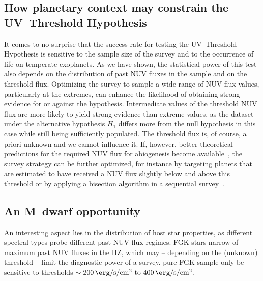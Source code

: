 \documentclass[twocolumn,twocolappendix,linenumbers]{aastex631}
\begin{document}
\subsection{How planetary context may constrain the UV~Threshold Hypothesis} %
It comes to no surprise that the success rate for testing the UV~Threshold Hypothesis is sensitive to the sample size of the survey and to the occurrence of life on temperate exoplanets.
As we have shown, the statistical power of this test also depends on the distribution of past \gls{NUV} fluxes in the sample and on the threshold flux.
Optimizing the survey to sample a wide range of \gls{NUV} flux values, particularly at the extremes, can enhance the likelihood of obtaining strong evidence for or against the hypothesis.
Intermediate values of the threshold \gls{NUV} flux are more likely to yield strong evidence than extreme values, as the dataset under the alternative hypothesis $H_1$ differs more from the null hypothesis in this case while still being sufficiently populated.
The threshold flux is, of course, a priori unknown and we cannot influence it.
If, however, better theoretical predictions for the required \gls{NUV} flux for abiogenesis become available~\citep{Rimmer2021}, the survey strategy can be further optimized, for instance by targeting planets that are estimated to have received a \gls{NUV} flux slightly below and above this threshold or by applying a bisection algorithm in a sequential survey~\citep{Fields2023}.

\subsection{An M~dwarf opportunity}
An interesting aspect lies in the distribution of host star properties, as different spectral types probe different past \gls{NUV} flux regimes.
FGK stars  narrow  of maximum past \gls{NUV} fluxes in the \gls{HZ}, which may -- depending on the (unknown) threshold  -- limit the diagnostic power of a survey.
 pure FGK sample  only be sensitive to  thresholds  $\sim\SIrange{200}{400}{\erg\per\second\per\centi\meter\squared}$.
\end{document}
